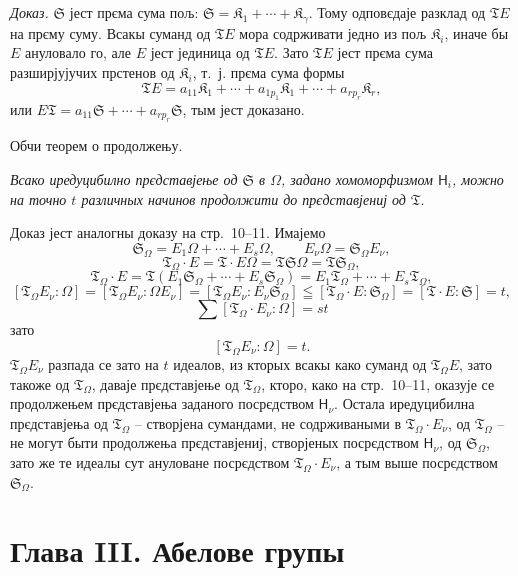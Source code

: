 \documentclass[11pt]{article}
\begin{document}
\emph{Доказ.} \(\mathfrak S\) јест прєма сума пољ: \(\mathfrak S=\mathfrak K_1+\cdots+\mathfrak K_\gamma\). Тому одповєдаје разклад од \(\mathfrak T E\) на прєму суму. Всакы суманд од \(\mathfrak T E\) мора содрживати једно из пољ \(\mathfrak K_i\), иначе бы \(E\) ануловало го, але \(E\) јест јединица од \(\mathfrak T E\). Зато \(\mathfrak T E\) јест прєма сума разширјујучих прстенов од \(\mathfrak K_i\), т.~ј. прєма сума формы
\[
\mathfrak T E=a_{11}\mathfrak K_1+\cdots+a_{1p_1}\mathfrak K_1+\cdots+a_{rp_r}\mathfrak K_r,
\]
или \(E\mathfrak T=a_{11}\mathfrak S+\cdots+a_{rp_r}\mathfrak S\), тым јест доказано.

\begin{center}
Обчи теорем о продолжењу.
\end{center}

\emph{Всако иредуцибилно прєдставјење од \(\mathfrak S\) в \(\Omega\), задано хомоморфизмом \(\mathsf{H}_i\), можно на точно \(t\) различных начинов продолжити до прєдставјениј од \(\mathfrak T\).}

Доказ јест аналогны доказу на стр.~10--11. Имајемо
\[
\mathfrak S_\Omega=E_1\Omega+\cdots+E_s\Omega,\qquad
E_\nu\Omega=\mathfrak S_\Omega E_\nu,
\]
\[
\mathfrak T_\Omega\cdot E=\mathfrak T\cdot E\Omega
=\mathfrak T\mathfrak S\Omega=\mathfrak T\mathfrak S_\Omega,
\]
\[
\mathfrak T_\Omega\cdot E
=\mathfrak T(E_1\mathfrak S_\Omega+\cdots+E_s\mathfrak S_\Omega)
=E_1\mathfrak T_\Omega+\cdots+E_s\mathfrak T_\Omega,
\]
\[
[\mathfrak T_\Omega E_\nu:\Omega]
=[\mathfrak T_\Omega E_\nu:\Omega E_\nu]
=[\mathfrak T_\Omega E_\nu:E_\nu\mathfrak S_\Omega]
\leqq[\mathfrak T_\Omega\cdot E:\mathfrak S_\Omega]
=[\mathfrak T\cdot E:\mathfrak S]=t,
\]
\[
\sum[\mathfrak T_\Omega\cdot E_\nu:\Omega]=st
\]
зато
\[
[\mathfrak T_\Omega E_\nu:\Omega]=t.
\]
\(\mathfrak T_\Omega E_\nu\) разпада се зато на \(t\) идеалов, из кторых всакы како суманд од \(\mathfrak T_\Omega E\), зато такоже од \(\mathfrak T_\Omega\), даваје прєдставјење од \(\mathfrak T_\Omega\), кторо, како на стр.~10--11, оказује се продолжењем прєдставјења заданого посрєдством \(\mathsf{H}_\nu\). Остала иредуцибилна прєдставјења од \(\mathfrak T_\Omega\) -- створјена сумандами, не содрживаными в \(\mathfrak T_\Omega\cdot E_\nu\), од \(\mathfrak T_\Omega\) -- не могут быти продолжења прєдставјениј, створјеных посрєдством \(\mathsf{H}_\nu\), од \(\mathfrak S_\Omega\), зато же те идеалы сут ануловане посрєдством \(\mathfrak T_\Omega\cdot E_\nu\), а тым выше посрєдством \(\mathfrak S_\Omega\).

\section*{Глава III. Абелове групы}\label{kapitel-iii.-abelsche-gruppen}
\end{document}
